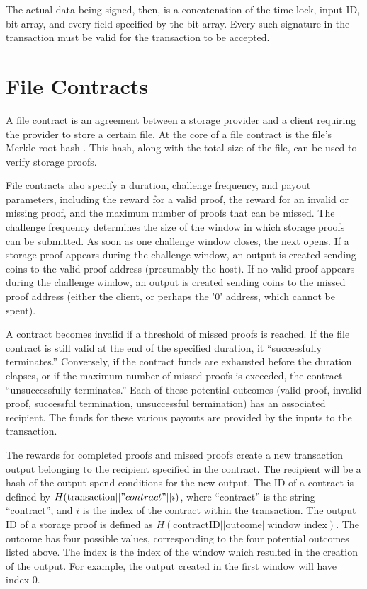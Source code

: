 \documentclass[twocolumn]{article}
\begin{document}
The actual data being signed, then, is a concatenation of the time lock, input ID, bit array, and every field specified by the bit array.
Every such signature in the transaction must be valid for the transaction to be accepted.

\section{File Contracts}
\label{sec:contracts}
A file contract is an agreement between a storage provider and a client requiring the provider to store a certain file.
At the core of a file contract is the file's Merkle root hash \cite{merkle}.
This hash, along with the total size of the file, can be used to verify storage proofs.

File contracts also specify a duration, challenge frequency, and payout parameters, including the reward for a valid proof, the reward for an invalid or missing proof, and the maximum number of proofs that can be missed.
The challenge frequency determines the size of the window in which storage proofs can be submitted.
As soon as one challenge window closes, the next opens.
If a storage proof appears during the challenge window, an output is created sending coins to the valid proof address (presumably the host).
If no valid proof appears during the challenge window, an output is created sending coins to the missed proof address (either the client, or perhaps the '0' address, which cannot be spent).

A contract becomes invalid if a threshold of missed proofs is reached.
If the file contract is still valid at the end of the specified duration, it ``successfully terminates.''
Conversely, if the contract funds are exhausted before the duration elapses, or if the maximum number of missed proofs is exceeded, the contract ``unsuccessfully terminates.''
Each of these potential outcomes (valid proof, invalid proof, successful termination, unsuccessful termination) has an associated recipient.
The funds for these various payouts are provided by the inputs to the transaction.

The rewards for completed proofs and missed proofs create a new transaction output belonging to the recipient specified in the contract.
The recipient will be a hash of the output spend conditions for the new output.
The ID of a contract is defined by $H(\text{transaction} || "contract" || i)$, where ``contract'' is the string ``contract'', and $i$ is the index of the contract within the transaction.
The output ID of a storage proof is defined as $H(\text{contractID} || \text{outcome} || \text{window index})$.
The outcome has four possible values, corresponding to the four potential outcomes listed above.
The index is the index of the window which resulted in the creation of the output.
For example, the output created in the first window will have index 0.
\end{document}
